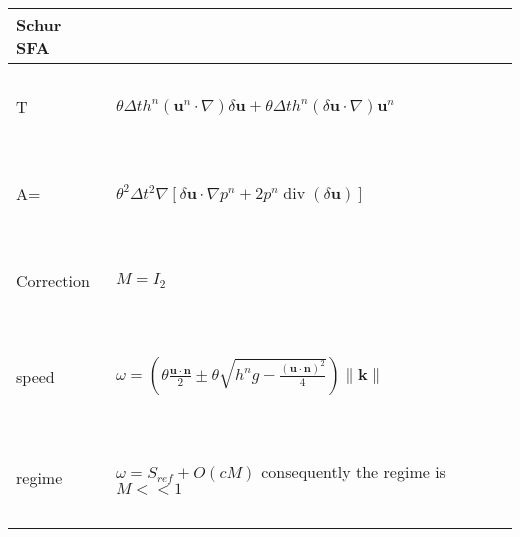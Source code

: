 \documentclass[a4paper, 11pt]{article}
\begin{document}
\begin{table}
\begin{tabular}{|l|l|}
  \hline
  Schur SFA &  \\
  \hline
  ~ & ~\\
  T &  $\theta\Delta th^n\left(\boldsymbol{u}^n\cdot\nabla\right)\delta \boldsymbol{u}+\theta\Delta th^n\left(\delta \boldsymbol{u} \cdot\nabla\right)\boldsymbol{u}^n$ \\ 
  ~ & ~\\
    \hline
   ~& ~\\ 
  A= & $\theta^2 \Delta t^2 \nabla\left[ \delta \boldsymbol{u}\cdot \nabla p^n + 2p^n \operatorname{div}(\delta \boldsymbol{u}) \right] $\\
  ~ & ~\\
      \hline
     ~ &~ \\
   Correction &  $M=I_2$ \\ 
   ~ & ~\\
    \hline
     ~ &~ \\
  speed & $\omega =\left(\theta\frac{\boldsymbol{u}\cdot \boldsymbol{n}}{2}\pm\theta\sqrt{h^ng-\frac{(\boldsymbol{u}\cdot \boldsymbol{n})^2}{4}}\right) \parallel \boldsymbol{k} \parallel$ \\ 
   ~ & ~\\
    \hline
    ~& ~\\
  regime & $\omega=S_{ref}+O(cM)$ consequently the regime is $M<< 1$\\
   ~& ~\\
    \hline
\end{tabular}
\end{table}
\end{document}
